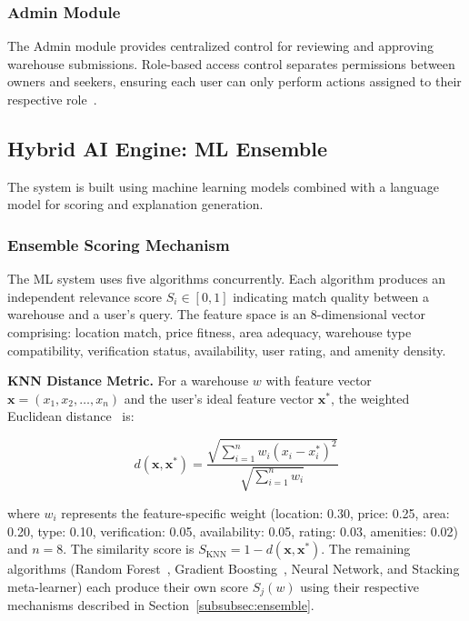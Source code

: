 \documentclass[pdflatex,sn-mathphys-num]{sn-jnl}
\theoremstyle{thmstyleone}
\theoremstyle{thmstyletwo}
\theoremstyle{thmstylethree}
\begin{document}
\subsubsection{Admin Module}\label{subsubsec:admin}

The Admin module provides centralized control for reviewing and approving warehouse submissions. Role-based access control separates permissions between owners and seekers, ensuring each user can only perform actions assigned to their respective role~\cite{b8}.

\subsection{Hybrid AI Engine: ML Ensemble}\label{subsec:hybrid}

The system is built using machine learning models combined with a language model for scoring and explanation generation.

\subsubsection{Ensemble Scoring Mechanism}\label{subsubsec:scoring}

The ML system uses five algorithms concurrently. Each algorithm produces an independent relevance score $S_i \in [0,1]$ indicating match quality between a warehouse and a user's query. The feature space is an 8-dimensional vector comprising: location match, price fitness, area adequacy, warehouse type compatibility, verification status, availability, user rating, and amenity density.

\textbf{KNN Distance Metric.} For a warehouse $w$ with feature vector $\mathbf{x} = (x_1, x_2, \ldots, x_n)$ and the user's ideal feature vector $\mathbf{x}^*$, the weighted Euclidean distance~\cite{b11} is:

\begin{equation}
d(\mathbf{x}, \mathbf{x}^*) = \frac{\sqrt{\sum_{i=1}^{n} w_i (x_i - x_i^*)^2}}{\sqrt{\sum_{i=1}^{n} w_i}}
\label{eq:knn}
\end{equation}

\noindent where $w_i$ represents the feature-specific weight (location: 0.30, price: 0.25, area: 0.20, type: 0.10, verification: 0.05, availability: 0.05, rating: 0.03, amenities: 0.02) and $n = 8$. The similarity score is $S_{\text{KNN}} = 1 - d(\mathbf{x}, \mathbf{x}^*)$. The remaining algorithms (Random Forest~\cite{b6}, Gradient Boosting~\cite{b12}, Neural Network, and Stacking meta-learner) each produce their own score $S_j(w)$ using their respective mechanisms described in Section~\ref{subsubsec:ensemble}.
\end{document}
